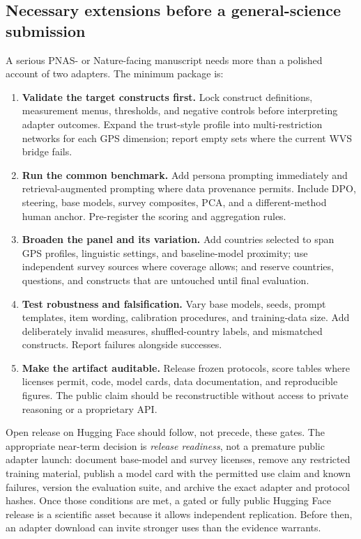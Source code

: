 \documentclass[10pt,letterpaper]{article}
\begin{document}
\subsection{Necessary extensions before a general-science submission}
A serious PNAS- or Nature-facing manuscript needs more than a polished account of two adapters. The minimum package is:
\begin{enumerate}
\item \textbf{Validate the target constructs first.} Lock construct definitions, measurement menus, thresholds, and negative controls before interpreting adapter outcomes. Expand the trust-style profile into multi-restriction networks for each GPS dimension; report empty sets where the current WVS bridge fails.
\item \textbf{Run the common benchmark.} Add persona prompting immediately and retrieval-augmented prompting where data provenance permits. Include DPO, steering, base models, survey composites, PCA, and a different-method human anchor. Pre-register the scoring and aggregation rules.
\item \textbf{Broaden the panel and its variation.} Add countries selected to span GPS profiles, linguistic settings, and baseline-model proximity; use independent survey sources where coverage allows; and reserve countries, questions, and constructs that are untouched until final evaluation.
\item \textbf{Test robustness and falsification.} Vary base models, seeds, prompt templates, item wording, calibration procedures, and training-data size. Add deliberately invalid measures, shuffled-country labels, and mismatched constructs. Report failures alongside successes.
\item \textbf{Make the artifact auditable.} Release frozen protocols, score tables where licenses permit, code, model cards, data documentation, and reproducible figures. The public claim should be reconstructible without access to private reasoning or a proprietary API.
\end{enumerate}

Open release on Hugging Face should follow, not precede, these gates. The appropriate near-term decision is \emph{release readiness}, not a premature public adapter launch: document base-model and survey licenses, remove any restricted training material, publish a model card with the permitted use claim and known failures, version the evaluation suite, and archive the exact adapter and protocol hashes. Once those conditions are met, a gated or fully public Hugging Face release is a scientific asset because it allows independent replication. Before then, an adapter download can invite stronger uses than the evidence warrants.
\end{document}

